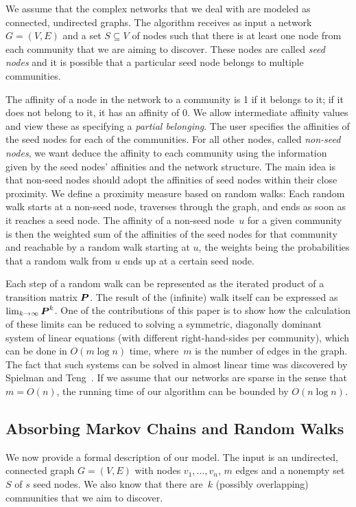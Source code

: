 We assume that the complex networks that we deal with are modeled as connected,
undirected graphs.  The algorithm receives as input a network $G = (V,E)$ and a
set $S \subseteq V$ of nodes such that there is at least one node from each
community that we are aiming to discover. These nodes are called \emph{seed
nodes} and it is possible that a particular seed node belongs to multiple
communities.

The affinity of a node in the network to a community is 1 if it belongs to it;
if it does not belong to it, it has an affinity of 0. We allow intermediate
affinity values and view these as specifying a \emph{partial belonging}. The
user specifies the affinities of the seed nodes for each of the communities. For
all other nodes, called \emph{non-seed nodes}, we want deduce the affinity to
each community using the information given by the seed nodes' affinities and the
network structure.  The main idea is that non-seed nodes should adopt the
affinities of seed nodes within their close proximity. We define a proximity
measure based on random walks: Each random walk starts at a non-seed node,
traverses through the graph, and ends as soon as it reaches a seed node. The
affinity of a non-seed node~$u$ for a given community is then the weighted sum
of the affinities of the seed nodes for that community and reachable by a random
walk starting at $u$, the weights being the probabilities that a random walk
from $u$ ends up at a certain seed node.

Each step of a random walk can be represented as the iterated product of a
transition matrix $\boldsymbol{P}$. The result of the (infinite) walk itself can be
expressed as $\lim_{k \rightarrow \infty}{\boldsymbol{P}^k}$.  One of the contributions
of this paper is to show how the calculation of these limits can be reduced to
solving a symmetric, diagonally dominant system of linear equations (with
different right-hand-sides per community), which can be done in $O(m \log n)$
time, where~$m$ is the number of edges in the graph. The fact that such systems
can be solved in almost linear time was discovered by Spielman and
Teng~\cite{ST04,EEST05,ST08,KMP10,KMP11,Vis13}. If we assume that our networks
are sparse in the sense that $m = O(n)$, the running time of our algorithm can
be bounded by $O(n \log n)$.    



\subsection{Absorbing Markov Chains and Random Walks}
We now provide a formal description of our model.  The input is an undirected,
connected graph $G = (V,E)$ with nodes $v_1, \ldots, v_n$, $m$ edges and a
nonempty set $S$ of $s$ seed nodes. We also know that there are~$k$ (possibly
overlapping) communities that we aim to discover.

